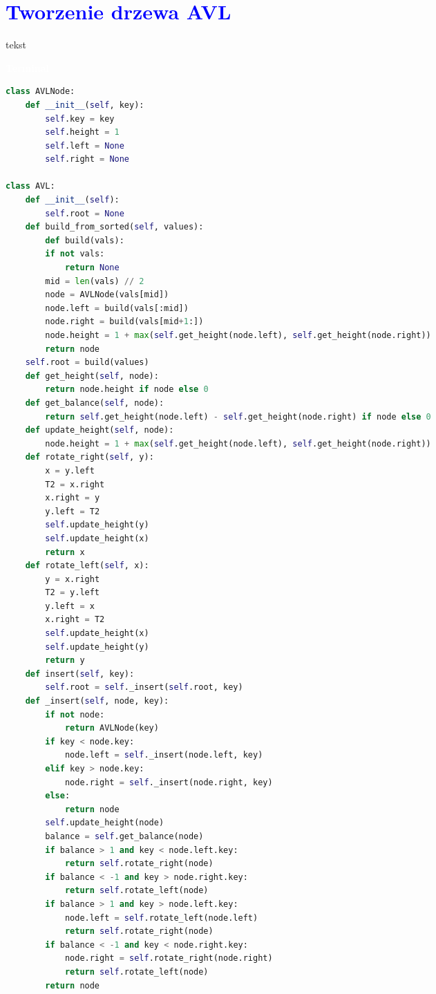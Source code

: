 \documentclass{article}
\begin{document}
	\newpage
	
	\section*{\textcolor{blue}{Tworzenie drzewa AVL}}
	\begin{multicols}{2}
		\noindent tekst
		
		\noindent 
		\begin{tcolorbox}[colback=black,colframe=gray!50!,arc=3mm,boxrule=0pt,left=0pt,right=0pt,width=\linewidth]
			\textcolor{white}{\textbf{\textsf{Terminal}}}\\
			
			\begin{lstlisting}[language=Python]
class AVLNode:
	def __init__(self, key):
		self.key = key
		self.height = 1
		self.left = None
		self.right = None

class AVL:
	def __init__(self):
		self.root = None
	def build_from_sorted(self, values):
		def build(vals):
		if not vals:
			return None
		mid = len(vals) // 2
		node = AVLNode(vals[mid])
		node.left = build(vals[:mid])
		node.right = build(vals[mid+1:])
		node.height = 1 + max(self.get_height(node.left), self.get_height(node.right))
		return node
	self.root = build(values)
	def get_height(self, node):
		return node.height if node else 0
	def get_balance(self, node):
		return self.get_height(node.left) - self.get_height(node.right) if node else 0
	def update_height(self, node):
		node.height = 1 + max(self.get_height(node.left), self.get_height(node.right))
	def rotate_right(self, y):
		x = y.left
		T2 = x.right
		x.right = y
		y.left = T2
		self.update_height(y)
		self.update_height(x)
		return x
	def rotate_left(self, x):
		y = x.right
		T2 = y.left
		y.left = x
		x.right = T2
		self.update_height(x)
		self.update_height(y)
		return y
	def insert(self, key):
		self.root = self._insert(self.root, key)
	def _insert(self, node, key):
		if not node:
			return AVLNode(key)
		if key < node.key:
			node.left = self._insert(node.left, key)
		elif key > node.key:
			node.right = self._insert(node.right, key)
		else:
			return node
		self.update_height(node)
		balance = self.get_balance(node)
		if balance > 1 and key < node.left.key:
			return self.rotate_right(node)
		if balance < -1 and key > node.right.key:
			return self.rotate_left(node)
		if balance > 1 and key > node.left.key:
			node.left = self.rotate_left(node.left)
			return self.rotate_right(node)
		if balance < -1 and key < node.right.key:
			node.right = self.rotate_right(node.right)
			return self.rotate_left(node)
		return node
			\end{lstlisting}
			
		\end{tcolorbox}
	\end{multicols}
\end{document}
